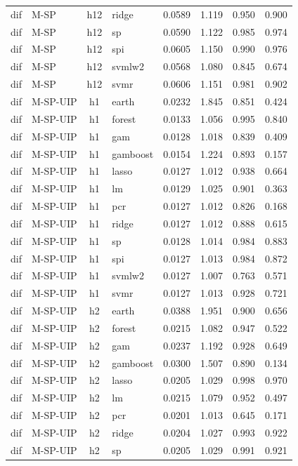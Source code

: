 \begin{ThreePartTable}
\begin{longtable}[t]{llclcccc}
dif & M-SP & h12 & ridge & 0.0589 & 1.119 & 0.950 & 0.900\\
dif & M-SP & h12 & sp & 0.0590 & 1.122 & 0.985 & 0.974\\
dif & M-SP & h12 & spi & 0.0605 & 1.150 & 0.990 & 0.976\\
dif & M-SP & h12 & svmlw2 & 0.0568 & 1.080 & 0.845 & 0.674\\
dif & M-SP & h12 & svmr & 0.0606 & 1.151 & 0.981 & 0.902\\
\addlinespace
dif & M-SP-UIP & h1 & earth & 0.0232 & 1.845 & 0.851 & 0.424\\
dif & M-SP-UIP & h1 & forest & 0.0133 & 1.056 & 0.995 & 0.840\\
dif & M-SP-UIP & h1 & gam & 0.0128 & 1.018 & 0.839 & 0.409\\
dif & M-SP-UIP & h1 & gamboost & 0.0154 & 1.224 & 0.893 & 0.157\\
dif & M-SP-UIP & h1 & lasso & 0.0127 & 1.012 & 0.938 & 0.664\\
dif & M-SP-UIP & h1 & lm & 0.0129 & 1.025 & 0.901 & 0.363\\
dif & M-SP-UIP & h1 & pcr & 0.0127 & 1.012 & 0.826 & 0.168\\
dif & M-SP-UIP & h1 & ridge & 0.0127 & 1.012 & 0.888 & 0.615\\
dif & M-SP-UIP & h1 & sp & 0.0128 & 1.014 & 0.984 & 0.883\\
dif & M-SP-UIP & h1 & spi & 0.0127 & 1.013 & 0.984 & 0.872\\
dif & M-SP-UIP & h1 & svmlw2 & 0.0127 & 1.007 & 0.763 & 0.571\\
dif & M-SP-UIP & h1 & svmr & 0.0127 & 1.013 & 0.928 & 0.721\\
\addlinespace
dif & M-SP-UIP & h2 & earth & 0.0388 & 1.951 & 0.900 & 0.656\\
dif & M-SP-UIP & h2 & forest & 0.0215 & 1.082 & 0.947 & 0.522\\
dif & M-SP-UIP & h2 & gam & 0.0237 & 1.192 & 0.928 & 0.649\\
dif & M-SP-UIP & h2 & gamboost & 0.0300 & 1.507 & 0.890 & 0.134\\
dif & M-SP-UIP & h2 & lasso & 0.0205 & 1.029 & 0.998 & 0.970\\
dif & M-SP-UIP & h2 & lm & 0.0215 & 1.079 & 0.952 & 0.497\\
dif & M-SP-UIP & h2 & pcr & 0.0201 & 1.013 & 0.645 & 0.171\\
dif & M-SP-UIP & h2 & ridge & 0.0204 & 1.027 & 0.993 & 0.922\\
dif & M-SP-UIP & h2 & sp & 0.0205 & 1.029 & 0.991 & 0.921\\

\end{longtable}
\end{ThreePartTable}
